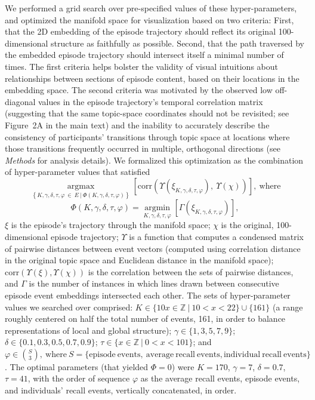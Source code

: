 \documentclass{article}
\newcommand{\argmax}{\mathop{\mathrm{argmax}}\limits}
\newcommand{\argmin}{\mathop{\mathrm{argmin}}\limits}
\begin{document}
We performed a grid search over pre-specified values of these hyper-parameters, and optimized the manifold space for visualization based on two criteria: First, that the 2D embedding of the episode trajectory should reflect its original 100-dimensional structure as faithfully as possible. Second, that the path traversed by the embedded episode trajectory should intersect itself a minimal number of times.  The first criteria helps bolster the validity of visual intuitions about relationships between sections of episode content, based on their locations in the embedding space.  The second criteria was motivated by the observed low off-diagonal values in the episode trajectory's temporal correlation matrix (suggesting that the same topic-space coordinates should not be revisited; see Figure~2A in the main text) and the inability to accurately describe the consistency of participants' transitions through topic space at locations where those transitions frequently occurred in multiple, orthogonal directions (see \textit{Methods} for analysis details).  We formalized this optimization as the combination of hyper-parameter values that satisfied
\[
\argmax_{\left\{K, \gamma, \delta, \tau, \varphi~\in~E~\mathrm{|}~\Phi\left(K, \gamma, \delta, \tau, \varphi \right) \right\}} \left[\mathrm{corr}\left(\Upsilon\left(\xi_{K, \gamma, \delta, \tau, \varphi}\right),~\Upsilon\left(\chi\right)\right)\right],~\mathrm{where}
\]
\[
\Phi\left(K, \gamma, \delta, \tau, \varphi \right) = \argmin_{K, \gamma, \delta, \tau, \varphi} \left[\Gamma\left(\xi_{K, \gamma, \delta, \tau, \varphi}\right)\right],
\]
$\xi$ is the episode's trajectory through the manifold space; $\chi$ is the original, 100-dimensional episode trajectory; $\Upsilon$ is a function that computes a condensed matrix of pairwise distances between event vectors (computed using correlation distance in the original topic space and Euclidean distance in the manifold space); $\mathrm{corr}\left(\Upsilon\left(\xi\right), \Upsilon\left(\chi\right)\right)$ is the correlation between the sets of pairwise distances, and $\Gamma$ is the number of instances in which lines drawn between consecutive episode event embeddings intersected each other.   The sets of hyper-parameter values we searched over comprised: $K \in \{10x \in \mathbb{Z}~|~10 < x <  22\} \cup \{161\}$ (a range roughly centered on half the total number of events, 161, in order to balance representations of local and global structure); $\gamma \in \{1, 3, 5, 7, 9\}$; $\delta \in \{0.1, 0.3, 0.5, 0.7, 0.9\}$; $\tau \in \{x \in \mathbb{Z}~|~0 < x < 101\}$; and $\varphi \in {S\choose3},~\mathrm{where}~S=\{\mathrm{episode~events,~average~recall~events, individual~recall~events}\}$.  The optimal parameters (that yielded $\Phi=0$) were $K=170$, $\gamma=7$, $\delta=0.7$, $\tau=41$, with the order of sequence $\varphi$ as the average recall events, episode events, and individuals' recall events, vertically concatenated, in order.
\end{document}
